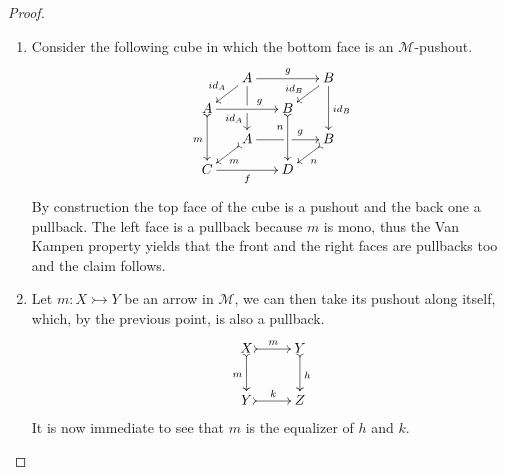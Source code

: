 \documentclass[a4paper,UKenglish,cleveref,pdftex,thm-restate,numberwithinsect]{lipics-v2021}
\def\C{\textbf {\textup{C}}}
\newcommand{\mto}{\rightarrowtail}
\newcommand{\id}[1]{\mathsf{id}_{#1}}
\begin{document}
\regmono*
\begin{proof}\label{regmono-proof}
	\begin{enumerate}
		\item  Consider the following cube in which the bottom face is an $\mathcal{M}$-pushout.
		\[\xymatrix@C=15pt@R=9pt{&A\ar[dd]|\hole_(.65){\id{A}}\ar[rr]^{g} \ar[dl]_{\id{A}} && B \ar[dd]^{\id{B}} \ar[dl]_(.6){\id{B}} \\ A  \ar@{>->}[dd]_{m}\ar[rr]^(.65){g} & & B \ar@{>->}[dd]_(.3){n}\\&A\ar[rr]|\hole^(.65){g} \ar@{>->}[dl]^{m} && B \ar@{>->}[dl]^{n} \\C \ar[rr]_{f} & & D}\]
		By construction the top face of the cube is a pushout and the back one a pullback. The left face is a pullback because $m$ is mono, thus the Van Kampen property yields that the front and the right faces are pullbacks too and the claim follows.
		\item Let $m\colon X\mto Y$ be an arrow in $\mathcal{M}$, we can then take its pushout along itself, which, by the previous point, is also a pullback.
		\[\xymatrix{X \ar@{>->}[r]^{m} \ar@{>->}[d]_{m}& Y \ar@{>->}[d]^{h}\\ Y \ar@{>->}[r]^{k} & Z}\]
		It is now immediate to see that $m$ is the equalizer of $h$ and $k$.   \qedhere
	\end{enumerate}
\end{proof}
\end{document}
